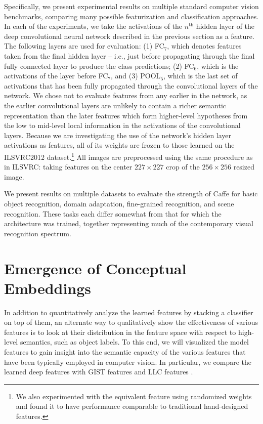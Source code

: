 Specifically, we present experimental results on multiple standard computer vision benchmarks, comparing many possible featurization and classification approaches.
In each of the experiments, we take the activations of the $n^{\mathrm{th}}$ hidden layer of the deep convolutional neural network described in the previous section as a feature. The following layers are used for evaluation:
(1) FC$_7$, which denotes features taken from the final hidden layer -- i.e., just before propagating through the final fully connected layer to produce the class predictions; (2) FC$_6$, which is the activations of the layer before FC$_7$, and (3) POOL$_5$, which is the last set of activations that has been fully propagated through the convolutional layers of the network.
We chose not to evaluate features from any earlier in the network, as the earlier convolutional layers are unlikely to contain a richer semantic representation than the later features which form higher-level hypotheses from the low to mid-level local information in the activations of the convolutional layers.
Because we are investigating the use of the network's hidden layer activations as features, all of its weights are frozen to those learned on the ILSVRC2012 dataset.\footnote{We also experimented with the equivalent feature using randomized weights and found it to have performance comparable to traditional hand-designed features.}
All images are preprocessed using the same procedure as in ILSVRC: taking features on the center $227 \times 227$ crop of the $256 \times 256$ resized image.

We present results on multiple datasets to evaluate the strength of Caffe for basic object recognition, domain adaptation, fine-grained recognition, and scene recognition. These tasks each differ somewhat from that for which the architecture was trained, together representing much of the contemporary visual recognition spectrum.



\section{Emergence of Conceptual Embeddings}
In addition to quantitatively analyze the learned features by stacking a classifier on top of them, an alternate way to qualitatively show the effectiveness of various features is to look at their distribution in the feature space with respect to high-level semantics, such as object labels. To this end, we will visualized the model features to gain insight into the semantic capacity of the various features that have been typically employed in computer vision. In particular, we compare the learned deep features with GIST features \cite{quattoni2009recognizing} and LLC features \cite{wang2010locality}.

